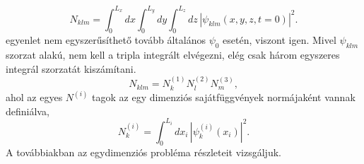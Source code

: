 \begin{equation}
	N_{klm} = \int_0^{L_x}dx\int_0^{L_y}dy\int_0^{L_z}dz\,|\psi_{klm}(x,y,z,t=0)|^2.
	\label{3dbox:3norm}
\end{equation}
 egyenlet nem egyszerűsíthető tovább általános $\psi_0$ esetén, viszont  igen. Mivel $\psi_{klm}$ szorzat alakú, nem kell a tripla integrált elvégezni, elég csak három egyszeres integrál szorzatát kiszámítani.
\begin{equation}
	N_{klm} = N^{(1)}_kN^{(2)}_lN^{(3)}_m,
\end{equation}
ahol az egyes $N^{(i)}$ tagok az egy dimenziós sajátfüggvények normájaként vannak definiálva,
\begin{equation}
	N^{(i)}_k = \int_0^{L_i}dx_i\,\left|\psi^{(i)}_k(x_i)\right|^2.
\end{equation}
A továbbiakban az egydimenziós probléma részleteit vizsgáljuk.
